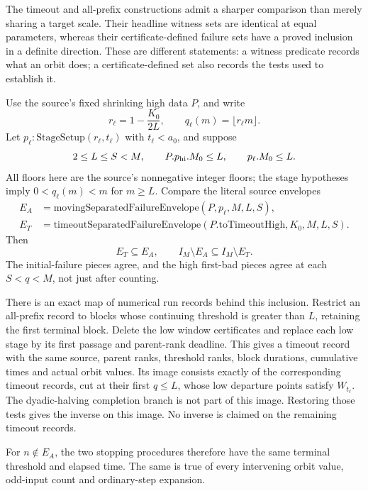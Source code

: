 The timeout and all-prefix constructions admit a sharper comparison than
merely sharing a target scale. Their headline witness sets are identical
at equal parameters, whereas their certificate-defined failure sets have
a proved inclusion in a definite direction. These are different statements:
a witness predicate records what an orbit does; a certificate-defined set
also records the tests used to establish it.

\begin{proposition}
\label{prop:Shaik-timeout-forgetting}
Use the source's fixed shrinking high data \(P\), and write
\[
 r_\ell=1-\frac{K_0}{2L},\qquad
 q_\ell(m)=\lfloor r_\ell m\rfloor .
\]
Let \(p_\ell:\mathrm{StageSetup}(r_\ell,t_\ell)\) with
\(t_\ell<a_0\), and suppose
\[
 2\le L\le S<M,\qquad
 P.p_{\rm hi}.M_0\le L,\qquad p_\ell.M_0\le L.
\]
All floors here are the source's nonnegative integer floors; the stage
hypotheses imply \(0<q_\ell(m)<m\) for \(m\ge L\).
Compare the literal source envelopes
\[
 \begin{aligned}
 E_A&=\mathrm{movingSeparatedFailureEnvelope}(P,p_\ell,M,L,S),\\
 E_T&=\mathrm{timeoutSeparatedFailureEnvelope}
                 (P.\mathrm{toTimeoutHigh},K_0,M,L,S).
 \end{aligned}
\]
Then
\begin{equation}\label{eq:Shaik-timeout-envelope-inclusion}
 E_T\subseteq E_A,\qquad I_M\setminus E_A\subseteq I_M\setminus E_T.
\end{equation}
The initial-failure pieces agree, and the high first-bad pieces agree
at each \(S<q<M\), not just after counting.

There is an exact map of numerical run records behind this inclusion.
Restrict an all-prefix record to blocks whose continuing threshold is
greater than \(L\), retaining the first terminal block. Delete the low
window certificates and replace each low stage by its first passage and
parent-rank deadline. This gives a timeout record with the same source,
parent ranks, threshold ranks, block durations, cumulative times and
actual orbit values. Its image consists exactly of the corresponding
timeout records, cut at their first \(q\le L\), whose low departure
points satisfy \(W_{t_\ell}\). The dyadic-halving completion branch is
not part of this image.
Restoring those tests gives the inverse on this image. No inverse is
claimed on the remaining timeout records.

For \(n\notin E_A\), the two stopping procedures therefore have the same
terminal threshold and elapsed time. The same is true of every intervening
orbit value, odd-input count and ordinary-step expansion.
\end{proposition}
